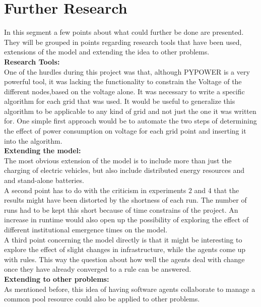 \documentclass[a4paper]{article}
\begin{document}
\section{Further Research}
In this segment a few points about what could further be done are presented. They will be grouped in points regarding research tools that
have been used, extensions of the model and extending the idea to other problems. \\
\textbf{Research Tools:}\\
One of the hurdles during this project was that, although PYPOWER is a very powerful tool, it was lacking the functionality to 
constrain the Voltage of the different nodes,based on the voltage alone. It was necessary to write a specific algorithm for each 
grid that was used. It would be useful to generalize this algorithm to be applicable to any kind of grid and not just the one it was 
written for. One simple first approach would be to automate the two steps of determining the effect of power consumption on 
voltage for each grid point and inserting it into  the algorithm.
\\
\textbf{Extending the model:}\\
The most obvious extension of the model is to include more than just the charging of electric vehicles, but also include distributed 
energy resources and and stand-alone batteries. \\
A second point has to do with the criticism in experiments 2 and 4 that the results might have been distorted by the shortness of each run. 
The number of runs had to be kept this short because of time constrains of the project. An increase in runtime would also open up the 
possibility of exploring the effect of different institutional emergence times on the model.\\
A third point concerning the model directly is that it might be interesting to explore the effect of slight changes in infrastructure, 
while the agents come up with rules. This way the question about how well the agents deal with change once they have already 
converged to a rule can be answered.
\\
\textbf{Extending to other problems:}\\
As mentioned before, this idea of having software agents collaborate to manage a common pool resource could also be applied to other 
problems. 
\clearpage
\end{document}
